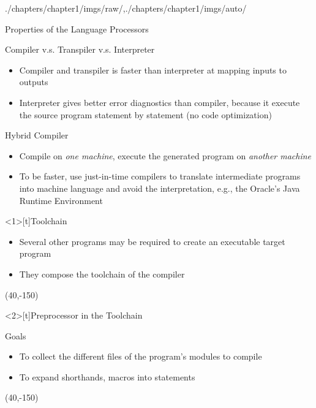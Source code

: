 \begin{graphicspathcontext}{{./chapters/chapter1/imgs/raw/},{./chapters/chapter1/imgs/auto/}}
\begin{bibunit}[apalike]
\begin{frame}{Properties of the Language Processors}
	\begin{smaller}
	\begin{block}{Compiler v.s. Transpiler v.s. Interpreter}
	\begin{itemize}
	\item Compiler and transpiler is faster than interpreter at mapping inputs to outputs
	\item Interpreter gives better error diagnostics than compiler, because it execute the source program statement by statement (no code optimization)
	\end{itemize}
	\end{block}
	\vspace{1cm}
	\begin{block}{Hybrid Compiler}
	\begin{itemize}
	\item Compile on \emph{one machine}, execute the generated program on \emph{another machine}
	\item To be faster, use just-in-time compilers to translate intermediate programs into machine language and avoid the interpretation, e.g., the Oracle's Java Runtime Environment
	\end{itemize}
	\end{block}
	\end{smaller}
\end{frame}

\begin{frame}<1>[t]{Toolchain}
	\begin{itemize}
	\item Several other programs may be required to create an executable target program
	\item They compose the toolchain of the compiler
	\end{itemize}
	\putat(40,-150){\includeanimatedfigure[width=.8\linewidth]{toolchain}}
\end{frame}

\begin{frame}<2>[t]{Preprocessor in the Toolchain}
	\begin{smaller}
	\begin{block}{\smaller Goals}
	\begin{itemize}
	\item To collect the different files of the program's modules to compile
	\item To expand shorthands, macros into statements
	\end{itemize}
	\end{block}
	\end{smaller}
	\putat(40,-150){}
\end{frame}


\end{bibunit}
\end{graphicspathcontext}
